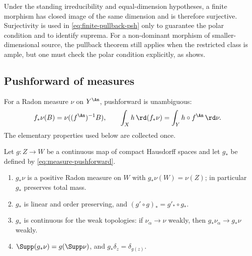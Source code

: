 \begin{remark}
\label{rem:ch30-finite-surjectivity}
Under the standing irreducibility and equal-dimension hypotheses, a finite
morphism has closed image of the same dimension and is therefore
surjective.  Surjectivity is used in
\eqref{eq:finite-pullback-psh} only to guarantee the polar condition and to
identify suprema.  For a non-dominant morphism of smaller-dimensional
source, the pullback theorem still applies when the restricted class is
ample, but one must check the polar condition explicitly, as
 shows.
\end{remark}

\subsection{Pushforward of measures}
\label{sec:ch30-finite-pushforward}

For a Radon measure $\nu$ on $Y^{\An}$, pushforward is unambiguous:
\begin{equation}
\label{eq:measure-pushforward}
       f_*\nu(B)=\nu((f^{\An})^{-1}B),\qquad
       \int_X h\,\rd(f_*\nu)=\int_Y h\circ f^{\An}\,\rd \nu.
\end{equation}
The elementary properties used below are collected once.

\begin{lemma}
\label{lem:ch30-pushforward-basic}
Let $g:Z\to W$ be a continuous map of compact Hausdorff spaces and let
$g_*$ be defined by \eqref{eq:measure-pushforward}.
\begin{enumerate}
\item\label{itm:ch30-pf:radon}
$g_*\nu$ is a positive Radon measure on $W$ with
$g_*\nu(W)=\nu(Z)$; in particular $g_*$ preserves total mass.
\item\label{itm:ch30-pf:linear}
$g_*$ is linear and order preserving, and $(g'\circ g)_*=g'_*\circ g_*$.
\item\label{itm:ch30-pf:weak}
$g_*$ is continuous for the weak topologies: if $\nu_\alpha\to\nu$
weakly, then $g_*\nu_\alpha\to g_*\nu$ weakly.
\item\label{itm:ch30-pf:support}
$\Supp(g_*\nu)=g(\Supp\nu)$, and $g_*\delta_z=\delta_{g(z)}$.
\end{enumerate}
\end{lemma}

